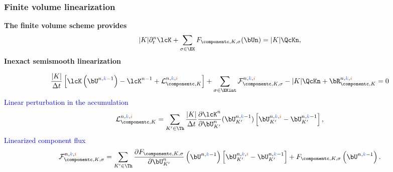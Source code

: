 \documentclass[10 pt]{beamer}
\begin{document}
\begin{frame}
\frametitle{Finite volume linearization}
\textcolor{cadmiumgreen}{\textbf{The finite volume scheme provides}}
\begin{equation*} 
  |K| \partial_t^n \lcK + \sum_{\sigma \in \EK} {F}_{\componentc,K,\sigma}(\bUn) =  |K|\QcKn,
\end{equation*}
\textcolor{cadmiumgreen}{\textbf{Inexact semismooth linearization}}

\begin{equation*}
\label{eq:flux:equation}
 \frac{|K|}{\Delta t}\left[\lcK\left(\bU^{n,\kk-1}\right) - \lcK^{n-1} + \mathcal{L}_{\componentc,K}^{n,\kk,\ii}\right] + \sum_{\sigma \in \EKint} \mathcal{F}_{\componentc,K,\sigma}^{n,\kk,\ii}- |K|\QcKn + {\bR}_{\componentc,K}^{n,\kk,\ii} = 0
\end{equation*}
 \textcolor{blue}{Linear perturbation in the accumulation}
\begin{equation*}
\mathcal{L}_{\componentc,K}^{n,\kk,\ii} = \sum_{K' \in \Th} \frac{|K|}{\Delta t}  \frac{\partial \lcK^n}{\partial \bU_{K'}^n}(\bU_{K'}^{n,\kk-1}) \left[\bU_{K'}^{n,\kk,\ii}-\bU_{K'}^{n,\kk-1} \right],
\end{equation*}
\textcolor{blue}{Linearized component flux}
\begin{equation*}
\label{eq:linearized:semi:smooth:component:flux}
\mathcal{F}_{\componentc,K,\sigma}^{n,\kk,\ii} = \sum_{K' \in \Th} \frac{\partial {F}_{\componentc,K,\sigma}}{\partial \bU_{K'}^n} \left(\bU^{n,\kk-1}\right) \left[\bU_{K'}^{n,\kk,\ii} -\bU_{K'}^{n,\kk-1} \right] + {F}_{\componentc,K,\sigma}\left(\bU^{n,\kk-1}\right).
\end{equation*}
\end{frame}
\end{document}
